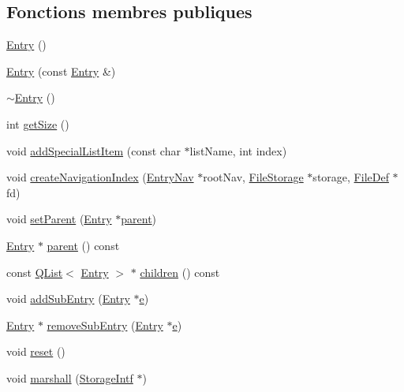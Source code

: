 \subsection*{Fonctions membres publiques}
\begin{DoxyCompactItemize}
\item 
\hyperlink{class_entry_a8283ac849b1f02ff82ca2ff28253db98}{Entry} ()
\item 
\hyperlink{class_entry_a98c62e07d86951008cc8a0d60632c262}{Entry} (const \hyperlink{class_entry}{Entry} \&)
\item 
\hyperlink{class_entry_ace080276d727881acfee7197b85f0b65}{$\sim$\+Entry} ()
\item 
int \hyperlink{class_entry_af8a7c9072149622cf62be17fc0bc9ec9}{get\+Size} ()
\item 
void \hyperlink{class_entry_aef1da1fbcf9b0f564b47fb7ddd201a1e}{add\+Special\+List\+Item} (const char $\ast$list\+Name, int index)
\item 
void \hyperlink{class_entry_a3f62f91546f105d6552fd8a89513bfaf}{create\+Navigation\+Index} (\hyperlink{class_entry_nav}{Entry\+Nav} $\ast$root\+Nav, \hyperlink{class_file_storage}{File\+Storage} $\ast$storage, \hyperlink{class_file_def}{File\+Def} $\ast$fd)
\item 
void \hyperlink{class_entry_a21bfe6584b202258d72fd158aac694c4}{set\+Parent} (\hyperlink{class_entry}{Entry} $\ast$\hyperlink{class_entry_a2161a0a728abbfc211fe5d6af9d6cc16}{parent})
\item 
\hyperlink{class_entry}{Entry} $\ast$ \hyperlink{class_entry_a2161a0a728abbfc211fe5d6af9d6cc16}{parent} () const 
\item 
const \hyperlink{class_q_list}{Q\+List}$<$ \hyperlink{class_entry}{Entry} $>$ $\ast$ \hyperlink{class_entry_ac030130465c1a51a13945b2e8738712e}{children} () const 
\item 
void \hyperlink{class_entry_a8c8479030e7a983413308cd412a926ff}{add\+Sub\+Entry} (\hyperlink{class_entry}{Entry} $\ast$\hyperlink{060__command__switch_8tcl_aff65a51a703804e0ad1adbcfd76c86f8}{e})
\item 
\hyperlink{class_entry}{Entry} $\ast$ \hyperlink{class_entry_aecaae1b0c184b1ee2dc342ce7d6300f1}{remove\+Sub\+Entry} (\hyperlink{class_entry}{Entry} $\ast$\hyperlink{060__command__switch_8tcl_aff65a51a703804e0ad1adbcfd76c86f8}{e})
\item 
void \hyperlink{class_entry_ae9367c39f34b043c6e36ddb52a4188e0}{reset} ()
\item 
void \hyperlink{class_entry_a902c34351fc9978dfe5530804827ceb6}{marshall} (\hyperlink{class_storage_intf}{Storage\+Intf} $\ast$)

\end{DoxyCompactItemize}

